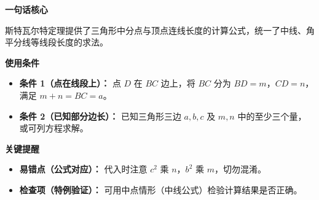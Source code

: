 \begin{summarybox}

	\textbf{\textcolor{CSummary}{一句话核心}}

	斯特瓦尔特定理提供了三角形中分点与顶点连线长度的计算公式，统一了中线、角平分线等线段长度的求法。

	\medskip
	\textbf{\textcolor{CSummary}{使用条件}}
	\begin{itemize}[leftmargin=*, itemsep=0.5em, topsep=0.4em]
		\item \textbf{条件 1（点在线段上）：} 点 $D$ 在 $BC$ 边上，将 $BC$ 分为 $BD=m$，$CD=n$，满足 $m+n=BC=a$。
		\item \textbf{条件 2（已知部分边长）：} 已知三角形三边 $a,b,c$ 及 $m,n$ 中的至少三个量，或可列方程求解。
	\end{itemize}

	\medskip
	\textbf{\textcolor{CSummary}{关键提醒}}
	\begin{itemize}[leftmargin=*, itemsep=0.5em, topsep=0.4em]
		\item \textbf{易错点（公式对应）：} 代入时注意 $c^{2}$ 乘 $n$，$b^{2}$ 乘 $m$，切勿混淆。
		\item \textbf{检查项（特例验证）：} 可用中点情形（中线公式）检验计算结果是否正确。
	\end{itemize}
\end{summarybox}
